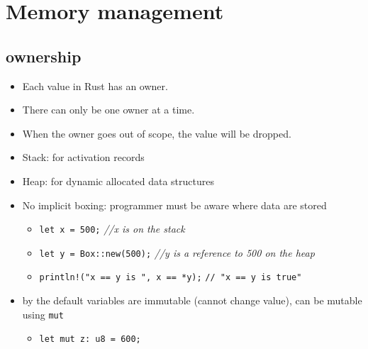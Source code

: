 \documentclass{article}
\begin{document}
\section{Memory management}

\subsection{ownership}
\begin{itemize}
    \item Each value in Rust has an owner.
    \item There can only be one owner at a time.
    \item When the owner goes out of scope, the value will be dropped.
\end{itemize}
\begin{itemize}
    \item Stack: for activation records
    \item Heap: for dynamic allocated data structures
    \item No implicit boxing: programmer must be aware where data are stored 
    \begin{itemize}
        \item \texttt{let x = 500;} \textit{//x is on the stack}
        \item \texttt{let y = Box::new(500);} \textit{//y is a reference to 500 on the heap}
        \item \texttt{println!("x == y is {}", x == *y);} \texttt{// "x == y is true"}
    \end{itemize}
    \item by the default variables are immutable (cannot change value), can be mutable using \texttt{mut}
    \begin{itemize}
        \item \texttt{let mut z: u8 = 600;}
    \end{itemize}

\end{itemize}
\end{document}
